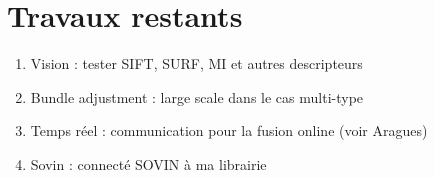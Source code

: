 \section{Travaux restants}

\begin{enumerate}
\item Vision : tester SIFT, SURF, MI et autres descripteurs
\item Bundle adjustment : large scale dans le cas multi-type
\item Temps réel : communication pour la fusion online (voir Aragues)
\item Sovin : connecté SOVIN à ma librairie
\end{enumerate}
